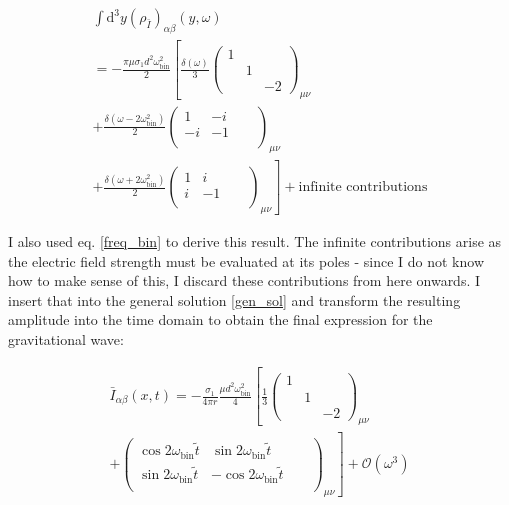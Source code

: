 \documentclass[11pt]{article}
\begin{document}
\begin{multline}
	\int \mathrm{d}^3 y \left( \rho_{\bar I} \right)_{\alpha \beta}
	\left( y, \omega \right)\\
	=
	-\frac{\pi \mu \sigma_1 d^2 \omega^2_{\text{bin}}}{2}
	\left[
	\frac{\delta\left( \omega \right)}{3}
	\begin{pmatrix}
	1 & & \\ & 1 & \\ & & -2
	\end{pmatrix}_{\mu \nu}
	\right.
	\\
	+
	\frac{\delta \left( \omega - 2 \omega^2_{\text{bin}} \right)}{2}
	\begin{pmatrix}
	1 & -i & \\ -i & -1 & \\ & & &
	\end{pmatrix}_{\mu \nu}
	\\
	\left.
	+
	\frac{\delta \left( \omega + 2 \omega^2_{\text{bin}} \right)}{2}
	\begin{pmatrix}
	1 & i & \\ i & -1 & \\ & & &
	\end{pmatrix}_{\mu \nu}
	\right] + \text{infinite contributions}
\end{multline}

I also used eq. \ref{freq_bin} to derive this result.
The infinite contributions arise as the electric field strength must be evaluated at its poles - since I do not know how to make sense of this, I discard these contributions from here onwards. I insert that into the general solution \ref{gen_sol} and transform the resulting amplitude into the time domain to obtain the final expression for the gravitational wave:

\begin{multline} \label{sol_I}
	\bar I_{\alpha \beta} \left( x, t\right)
	=
	- \frac{\sigma_1}{4 \pi r}
	\frac{\mu d^2 \omega_{\text{bin}}^2}{4} 
	\left[
	\frac{1}{3}
	\begin{pmatrix}
	1 & & \\ & 1 & \\ & & -2
	\end{pmatrix}_{\mu \nu}
	\right.
	\\
	\left.
	+
	\begin{pmatrix}
		\cos{2 \omega_{\text{bin}} \tilde t}
		 & \sin{2 \omega_{\text{bin}} \tilde t}
		 &
		 \\
		 \sin{2 \omega_{\text{bin}} \tilde t}
		 & - \cos{2 \omega_{\text{bin}} \tilde t}
		 &
		 \\
		 &
		 &
		 &
	\end{pmatrix}_{\mu \nu}
	\right] + \mathcal{O} \left( \omega^3 \right)
\end{multline}
\end{document}
